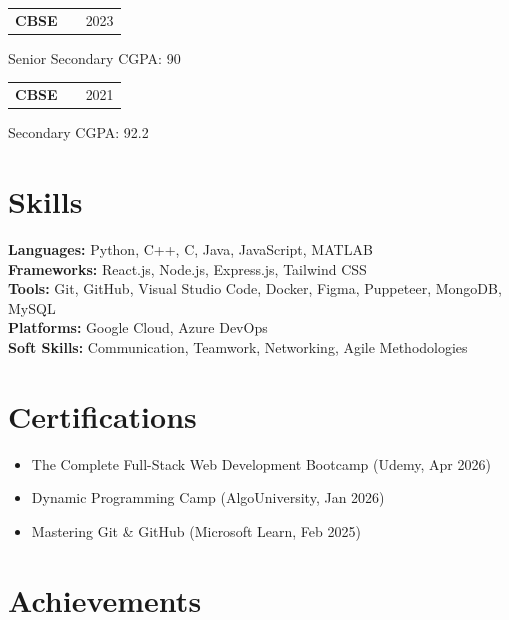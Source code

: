 \documentclass[a4paper,10pt]{article}
\makeatletter
\newenvironment{jobshort}[2]
    {
    \begin{tabularx}{\linewidth}{@{}l X r@{}}
    \textbf{#1} & \hfill &  #2 \\[3.75pt]
    \end{tabularx}
    }
    {
    }
\makeatother
\begin{document}
\begin{jobshort}{CBSE}{2023}
\end{jobshort}
Senior Secondary \hfill CGPA: 90\\[6pt]


\begin{jobshort}{CBSE}{2021}
\end{jobshort}
Secondary \hfill CGPA: 92.2\\[6pt]


\section{Skills}

\textbf{Languages:} Python, C++, C, Java, JavaScript, MATLAB \\[4pt]
\textbf{Frameworks:} React.js, Node.js, Express.js, Tailwind CSS \\[4pt]
\textbf{Tools:} Git, GitHub, Visual Studio Code, Docker, Figma, Puppeteer, MongoDB, MySQL \\[4pt]
\textbf{Platforms:} Google Cloud, Azure DevOps \\[4pt]
\textbf{Soft Skills:} Communication, Teamwork, Networking, Agile Methodologies \\[4pt]

\section{Certifications}

\begin{itemize}[nosep,leftmargin=1.2em]
\item The Complete Full-Stack Web Development Bootcamp (Udemy, Apr 2026)
\item Dynamic Programming Camp (AlgoUniversity, Jan 2026)
\item Mastering Git \& GitHub (Microsoft Learn, Feb 2025)
\end{itemize}

\section{Achievements}
\end{document}
